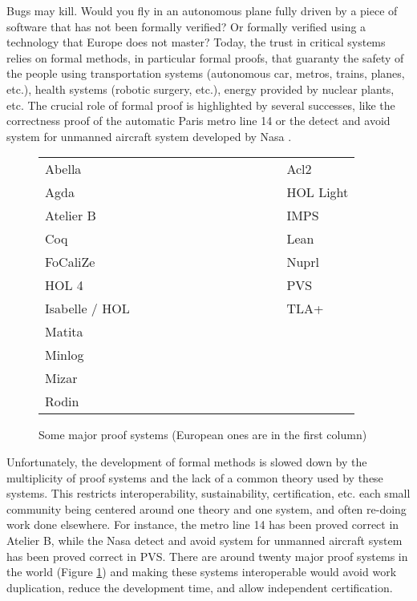 Bugs may kill. Would you fly in an autonomous plane fully driven by a
piece of software that has not been formally verified?  Or formally
verified using a technology that Europe does not master? Today, the
trust in critical systems relies on formal methods, in particular
formal proofs, that guaranty the safety of the people using
transportation systems (autonomous car, metros, trains, planes, etc.),
health systems (robotic surgery, etc.), energy provided by nuclear
plants, etc. The crucial role of formal proof is highlighted by
several successes, like the correctness proof of the automatic Paris
metro line 14 \cite{metro14} or the detect and avoid system for
unmanned aircraft system developed by Nasa \cite{Munoz16}.

\thispagestyle{empty}

\begin{figure}
\begin{tabular}{ll}
{\sc Abella}~~~~~~~~~~~~~~~~~~~~~~~~~~~~~~&{\sc Acl2}\\
{\sc Agda}  &  {\sc HOL Light}\\
{\sc Atelier B}  &  {\sc IMPS}\\
{\sc Coq}  &  {\sc Lean}\\
{\sc FoCaliZe}  &  {\sc Nuprl}\\
{\sc HOL 4}  &  {\sc PVS}\\
{\sc Isabelle / HOL}  &  {\sc TLA+}\\
{\sc Matita}\\
{\sc Minlog}\\
{\sc Mizar}\\
{\sc Rodin}\\
\end{tabular}
\caption{Some major proof systems (European ones are in the first column) \label{systems}}
\end{figure}

Unfortunately, the development of formal methods is slowed down by the
multiplicity of proof systems and the lack of a common theory used by
these systems. This restricts interoperability, sustainability,
certification, etc.  each small community being centered around one
theory and one system, and often re-doing work done elsewhere.  For
instance, the metro line 14 has been proved correct in {\sc Atelier
B}, while the Nasa detect and avoid system for unmanned aircraft
system has been proved correct in {\sc PVS}.  There are around twenty
major proof systems in the world (Figure \ref{systems}) and making
these systems interoperable would avoid work duplication, reduce the
development time, and allow independent certification.


